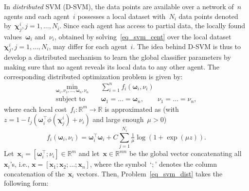 \documentclass[letterpaper, 10pt, conference]{ieeeconf}
\newtheorem{rem}{Remark}
\def\mb{\mathbf}
\def\mbb{\mathbb}
\begin{document}
In \textit{distributed} SVM (D-SVM), the data points are available over a network of~$n$ agents and each agent~$i$ possesses a local dataset with~$N_i$ data points denoted  by~$\boldsymbol{\chi}^i_j,{j=1,\ldots,N_i}$.  Since each agent has access to partial data, the locally found values~$\boldsymbol{\omega}_i$ and~$\nu_i$, obtained by solving~\eqref{eq_svm_cent} over the local dataset~$\boldsymbol{\chi}^i_j,{j=1,\ldots,N_i}$,
may differ for each agent~$i$. The idea behind D-SVM is thus to develop a distributed mechanism to learn the global classifier parameters by making sure that no agent reveals its local data to any other agent. The corresponding distributed optimization  problem is given by: 
\begin{equation} \label{eq_svm_dist}
	\begin{aligned}
		\displaystyle
		 \min_{\boldsymbol{\omega}_1,\nu_1,\ldots,\boldsymbol{\omega}_n,\nu_n}
		\quad &  \sum_{i=1}^{n} f_i(\boldsymbol{\omega}_i,\nu_i) \\
		 \text{subject to} \quad&  \boldsymbol{\omega}_1 = \dots = \boldsymbol{\omega}_n,\qquad\nu_1 = \dots =\nu_n,
	\end{aligned}
\end{equation}
where each local cost~${f_i:\mathbb{R}^m\rightarrow\mbb R}$ is approximated as (with~${z=1-l_j( \boldsymbol{\omega}_i^\top \phi(\boldsymbol{\chi}^i_j)+\nu_i)}$ and large enough~$\mu>0$)
\begin{equation*}
f_i(\boldsymbol{\omega}_i,\nu_i)=\boldsymbol{\omega}_i^\top \boldsymbol{\omega}_i + C \sum_{j=1}^{N_i} \tfrac{1}{\mu}\log (1+\exp(\mu z)).
\end{equation*}
Let~${\mb{x}_i = [\boldsymbol{\omega}_i^\top;\nu_i]}\in\mathbb{R}^m$ and let~$\mb{x} \in \mathbb{R}^{mn}$ be the global vector concatenating all~$\mb{x}_i$'s, i.e.,
${\mb{x} = [\mb{x}_1;\mb{x}_2;\dots;\mb{x}_n]}$, where the symbol~`$;$' denotes the column concatenation of the~$\mb{x}_i$ vectors. Then, Problem~\eqref{eq_svm_dist} takes the following form:   
\end{document}
